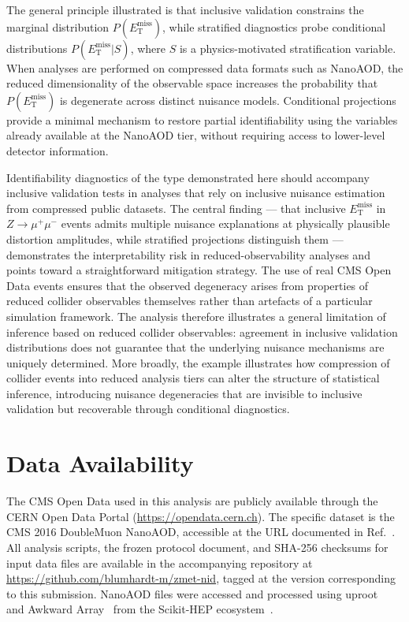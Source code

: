 \documentclass[a4paper,11pt]{article}
\newcommand{\MET}{\ensuremath{E_{\mathrm{T}}^{\mathrm{miss}}}\xspace}
\newcommand{\zmumu}{\ensuremath{Z\!\to\!\mu^+\mu^-}\xspace}
\begin{document}
The general principle illustrated is that inclusive validation constrains
the marginal distribution $P(\MET)$, while stratified diagnostics probe
conditional distributions $P(\MET|S)$, where $S$ is a physics-motivated
stratification variable.
When analyses are performed on compressed data formats such as NanoAOD, the
reduced dimensionality of the observable space increases the probability
that $P(\MET)$ is degenerate across distinct nuisance models.
Conditional projections provide a minimal mechanism to restore partial
identifiability using the variables already available at the NanoAOD tier,
without requiring access to lower-level detector information.

Identifiability diagnostics of the type demonstrated here should accompany
inclusive validation tests in analyses that rely on inclusive nuisance
estimation from compressed public datasets.
The central finding --- that inclusive \MET in \zmumu events admits multiple
nuisance explanations at physically plausible distortion amplitudes, while
stratified projections distinguish them --- demonstrates the
interpretability risk in reduced-observability analyses and points toward a
straightforward mitigation strategy.
The use of real CMS Open Data events ensures that the observed degeneracy
arises from properties of reduced collider observables themselves rather
than artefacts of a particular simulation framework.
The analysis therefore illustrates a general limitation of inference based
on reduced collider observables: agreement in inclusive validation
distributions does not guarantee that the underlying nuisance mechanisms are
uniquely determined.
More broadly, the example illustrates how compression of collider events
into reduced analysis tiers can alter the structure of statistical
inference, introducing nuisance degeneracies that are invisible to inclusive
validation but recoverable through conditional diagnostics.

\section*{Data Availability}

The CMS Open Data used in this analysis are publicly available through the
CERN Open Data Portal (\url{https://opendata.cern.ch}).
The specific dataset is the CMS 2016 DoubleMuon NanoAOD, accessible at
the URL documented in Ref.~\cite{CMSOpenData:2016}.
All analysis scripts, the frozen protocol document, and SHA-256 checksums
for input data files are available in the accompanying repository at
\url{https://github.com/blumhardt-m/zmet-nid}, tagged at the version
corresponding to this submission.
NanoAOD files were accessed and processed using
uproot~\cite{Pivarski:uproot} and Awkward Array~\cite{Pivarski:2018}
from the Scikit-HEP ecosystem~\cite{Rodrigues:2020}.
\end{document}
